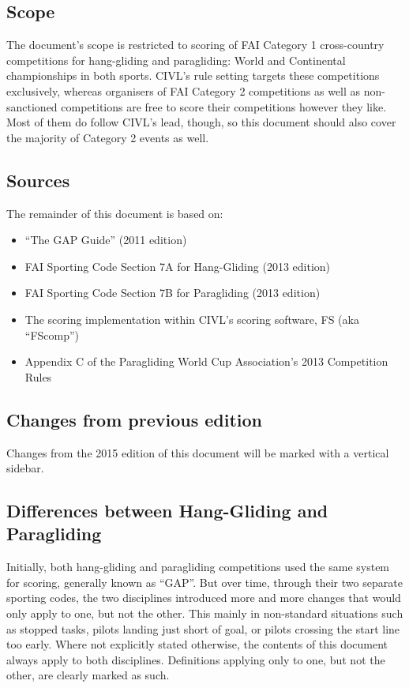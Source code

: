 \documentclass{article}
\begin{document}
\subsection{Scope}
The document’s scope is restricted to scoring of FAI Category 1 cross-country
competitions for hang-gliding and paragliding: World and Continental
championships in both sports. CIVL’s rule setting targets these competitions
exclusively, whereas organisers of FAI Category 2 competitions as well as
non-sanctioned competitions are free to score their competitions however they
like. Most of them do follow CIVL’s lead, though, so this document should also
cover the majority of Category 2 events as well.

\subsection{Sources}
The remainder of this document is based on:
\begin{itemize}
\item “The GAP Guide” (2011 edition)
\item FAI Sporting Code Section 7A for Hang-Gliding (2013 edition)
\item FAI Sporting Code Section 7B for Paragliding (2013 edition)
\item The scoring implementation within CIVL’s scoring software, FS (aka “FScomp”)
\item Appendix C of the Paragliding World Cup Association’s 2013 Competition Rules
\end{itemize}

\subsection{Changes from previous edition}
Changes from the 2015 edition of this document will be marked with a vertical
sidebar.

\subsection{Differences between Hang-Gliding and Paragliding}
Initially, both hang-gliding and paragliding competitions used the same system
for scoring, generally known as “GAP”. But over time, through their two
separate sporting codes, the two disciplines introduced more and more changes
that would only apply to one, but not the other. This mainly in non-standard
situations such as stopped tasks, pilots landing just short of goal, or pilots
crossing the start line too early. Where not explicitly stated otherwise, the
contents of this document always apply to both disciplines. Definitions
applying only to one, but not the other, are clearly marked as such.
\end{document}
